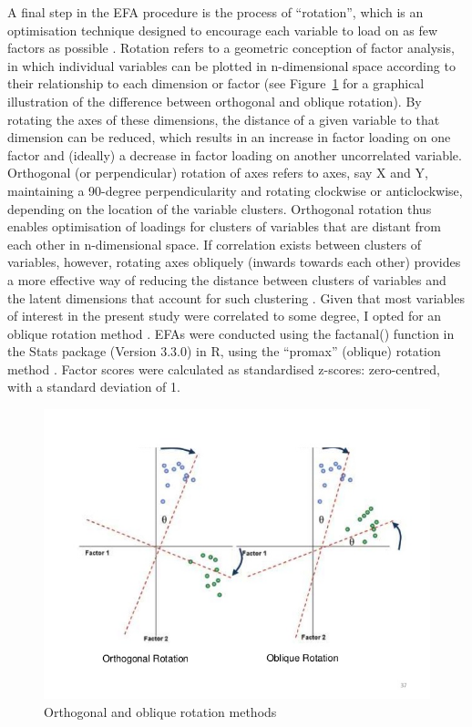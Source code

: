 \begin{CJK}{UTF8}{gbsn}
A final step in the EFA procedure is the process of ``rotation'', which is an optimisation technique designed to encourage each variable to load on as few factors as possible \citep{Rummel1988}. Rotation refers to a geometric conception of factor analysis, in which individual variables can be plotted in n-dimensional space according to their relationship to each dimension or factor (see Figure~\ref{fig:orthogonalOblique} for a graphical  illustration of the difference between orthogonal and oblique rotation). By rotating the axes of these dimensions, the distance of a given variable to that dimension can be reduced, which results in an increase in factor loading on one factor and (ideally) a decrease in factor loading on another uncorrelated variable. Orthogonal (or perpendicular) rotation of axes refers to axes, say X and Y, maintaining a 90-degree perpendicularity and rotating clockwise or anticlockwise, depending on the location of the variable clusters.
Orthogonal rotation thus enables optimisation of loadings for clusters of variables that are distant from each other in n-dimensional space. If correlation exists between clusters of variables, however, rotating axes obliquely (inwards towards each other) provides a more effective way of reducing the distance between clusters of variables and the latent dimensions that account for such clustering \citep{Osborne2015}.  Given that most variables of interest in the present study were correlated to some degree, I opted for an oblique rotation method \citep{Field2012}. EFAs were conducted using the factanal() function in the Stats package (Version 3.3.0) in R, using the ``promax'' (oblique) rotation method \citep{Gorsuch1983}. Factor scores were calculated as standardised z-scores: zero-centred, with a standard deviation of 1.

\begin{figure}[htbp]
  \begin{center}
    \includegraphics[width= \linewidth, scale = .4]{images/orthogonalObliqueRotationExample.jpg}
    \caption{Orthogonal and oblique rotation methods}
    \label{fig:orthogonalOblique}
  \end{center}
\end{figure}



\end{CJK}
